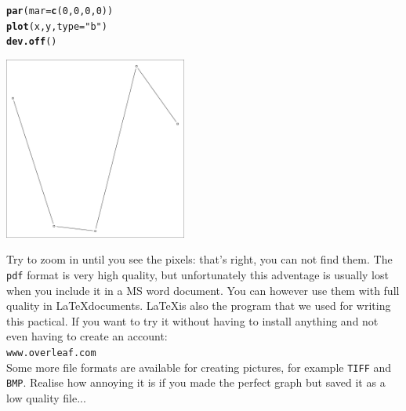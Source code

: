 \documentclass{article}\usepackage[]{graphicx}\usepackage[]{color}
\makeatletter
\newcommand{\hlnum}[1]{\textcolor[rgb]{0.686,0.059,0.569}{#1}}%
\newcommand{\hlstr}[1]{\textcolor[rgb]{0.192,0.494,0.8}{#1}}%
\newcommand{\hlstd}[1]{\textcolor[rgb]{0.345,0.345,0.345}{#1}}%
\newcommand{\hlkwc}[1]{\textcolor[rgb]{0.333,0.667,0.333}{#1}}%
\newcommand{\hlkwd}[1]{\textcolor[rgb]{0.737,0.353,0.396}{\textbf{#1}}}%
\newenvironment{kframe}{%
 \def\at@end@of@kframe{}%
 \ifinner\ifhmode%
  \def\at@end@of@kframe{\end{minipage}}%
  \begin{minipage}{\columnwidth}%
 \fi\fi%
 \def\FrameCommand##1{\hskip\@totalleftmargin \hskip-\fboxsep
 \colorbox{shadecolor}{##1}\hskip-\fboxsep
     \hskip-\linewidth \hskip-\@totalleftmargin \hskip\columnwidth}%
 \MakeFramed {\advance\hsize-\width
   \@totalleftmargin\z@ \linewidth\hsize
   \@setminipage}}%
 {\par\unskip\endMakeFramed%
 \at@end@of@kframe}
\newenvironment{knitrout}{}{} %
\makeatother
\begin{document}
\begin{mdframed}
\begin{knitrout}
\begin{kframe}
\begin{alltt}
\hlkwd{par}\hlstd{(}\hlkwc{mar}\hlstd{=}\hlkwd{c}\hlstd{(}\hlnum{0}\hlstd{,}\hlnum{0}\hlstd{,}\hlnum{0}\hlstd{,}\hlnum{0}\hlstd{))}
\hlkwd{plot}\hlstd{(x,y,}\hlkwc{type}\hlstd{=}\hlstr{"b"}\hlstd{)}
\hlkwd{dev.off}\hlstd{()}
\end{alltt}
\end{kframe}
\end{knitrout}
\begin{center}
\includegraphics[width=0.45\textwidth]{pdf1.pdf}
\end{center}
Try to zoom in until you see the pixels: that's right, you can not find them. The \texttt{pdf} format is very high quality, but unfortunately this adventage is usually lost when you include it in a MS word document. You can however use them with full quality in \LaTeX documents. \LaTeX is also the program that we used for writing this pactical. If you want to try it without having to install anything and not even having to create an account:\\
\texttt{www.overleaf.com} \\
Some more file formats are available for creating pictures, for example \texttt{TIFF} and \texttt{BMP}. Realise how annoying it is if you made the perfect graph but saved it as a low quality file...
\end{mdframed}
\end{document}
